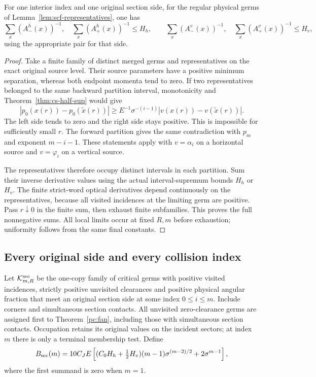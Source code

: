 \begin{lemma}
\label{lem:scf-halfsums}
For one interior index and one original section side, for the
regular physical germs of Lemma~\ref{lem:scf-representatives}, one has
\begin{equation}\label{eq:scf-halfsums}
 \sum_x(A_-^h(x))^{-1},\quad\sum_x(A_+^h(x))^{-1}\le H_h,
 \qquad
 \sum_x(A_-^v(x))^{-1},\quad\sum_x(A_+^v(x))^{-1}\le H_v,
\end{equation}
using the appropriate pair for that side.
\end{lemma}
\begin{proof}
Take a finite family of distinct merged germs and representatives
on the exact original source level. Their source parameters have a positive
minimum separation, whereas both endpoint momenta tend to zero.
If two representatives belonged to the same backward partition
interval, monotonicity and Theorem~\ref{thm:cs-half-sup} would give
\[
 |p_0(x(r))-p_0(\widetilde x(r))|
 \ge E^{-1}\sigma^{-(i-1)}
                    |v(x(r))-v(\widetilde x(r))|.
\]
The left side tends to zero and the right side stays positive.
This is impossible for sufficiently small $r$. The forward
partition gives the same contradiction with $p_m$ and exponent
$m-i-1$. These statements apply with $v=\alpha_i$ on a horizontal
source and $v=\varphi_i$ on a vertical source.

The representatives therefore occupy distinct intervals in each
partition. Sum their inverse derivative values using the actual
interval-supremum bounds $H_h$ or $H_v$. The finite strict-word
optical derivatives depend continuously on the representatives,
because all visited incidences at the limiting germ are positive.
Pass $r\downarrow0$ in the finite sum, then exhaust finite
subfamilies. This proves the full nonnegative sums.
All local limits occur at fixed $R,m$ before exhaustion;
uniformity follows from the same final constants.
\end{proof}

\subsection{Every original side and every collision index}

Let $\mathcal K^{\rm sec}_{m,R}$ be the one-copy family of
critical germs with positive visited incidences, strictly positive
unvisited clearances and positive physical angular fraction that
meet an original section side at some index $0\le i\le m$.
Include corners and simultaneous section contacts. All unvisited
zero-clearance germs are assigned first to Theorem~\ref{pc:fan},
including those with simultaneous section contacts. Occupation retains its
original values on the incident sectors; at index $m$ there is
only a terminal membership test. Define
\begin{equation}\label{eq:scf-Bsec}
 B_{\rm sec}(m)=10C_JE\left[
 (C_0H_h+\tfrac12H_v)(m-1)\sigma^{(m-2)/2}
                   +2\sigma^{m-1}\right],
\end{equation}
where the first summand is zero when $m=1$.


